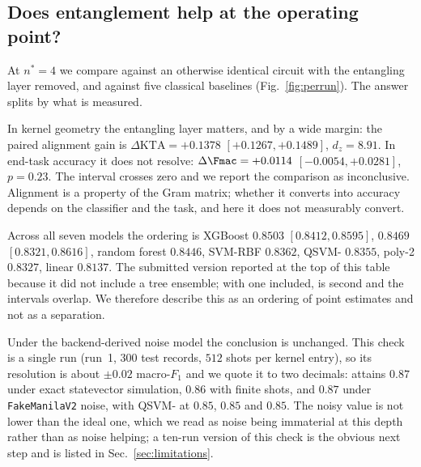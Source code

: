 \subsection{Does entanglement help at the operating point?}
\label{sec:res-c2}


\begin{revbody}


At $n^\ast=4$ we compare \QSVM{} against an otherwise identical circuit with the
entangling layer removed, and against five classical baselines
(Fig.~\ref{fig:perrun}). The answer splits by what is measured.

In kernel geometry the entangling layer matters, and by a wide margin: the
paired alignment gain is $\Delta\mathrm{KTA} = +0.1378$
$[+0.1267,+0.1489]$, $d_z=8.91$. In end-task accuracy it does not resolve:
$\Delta\Fmac = +0.0114$ $[-0.0054,+0.0281]$, $p=0.23$. The interval crosses zero
and we report the comparison as inconclusive. Alignment is a property of the
Gram matrix; whether it converts into accuracy depends on the classifier and the
task, and here it does not measurably convert.

Across all seven models the ordering is
XGBoost $0.8503$ $[0.8412,0.8595]$, \QSVM{} $0.8469$ $[0.8321,0.8616]$, random
forest $0.8446$, SVM-RBF $0.8362$, QSVM-\Zmap{} $0.8355$, poly-2 $0.8327$,
linear $0.8137$. The submitted version reported \QSVM{} at the top of this table
because it did not include a tree ensemble; with one included, \QSVM{} is second
and the intervals overlap. We therefore describe this as an ordering of point
estimates and not as a separation.

Under the backend-derived noise model the conclusion is unchanged. This check
is a single run (run~1, $300$ test records, $512$ shots per kernel entry), so
its resolution is about $\pm0.02$ macro-$F_1$ and we quote it to two decimals:
\QSVM{} attains $0.87$ under exact statevector simulation, $0.86$ with finite
shots, and $0.87$ under \texttt{FakeManilaV2} noise, with QSVM-\Zmap{} at
$0.85$, $0.85$ and $0.85$. The noisy value is not lower than the ideal one,
which we read as noise being immaterial at this depth rather than as noise
helping; a ten-run version of this check is the obvious next step and is
listed in Sec.~\ref{sec:limitations}.
\end{revbody}


